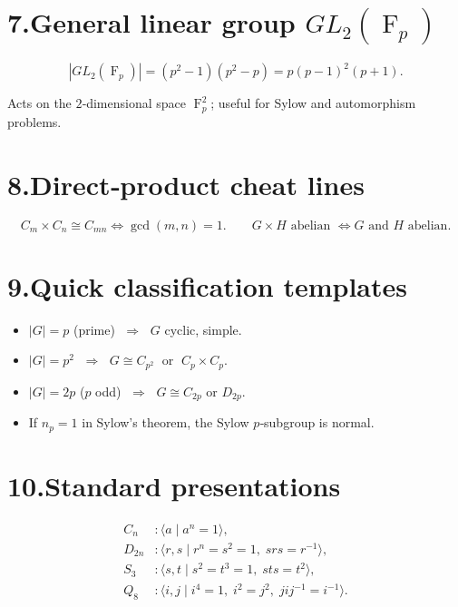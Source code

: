 \documentclass[12pt]{article}
\DeclareMathOperator{\F}{F}
\theoremstyle{definition} %
\theoremstyle{plain} %
\begin{document}
  \bigskip
  \section*{7.\;General linear group $GL_{2}(\F_{p})$}
  
  \[
     |GL_{2}(\F_{p})|=(p^{2}-1)(p^{2}-p)=p(p-1)^{2}(p+1).
  \]
  
  Acts on the $2$‑dimensional space $\F_{p}^{2}$; useful for Sylow and automorphism problems.
  
  \bigskip
  \section*{8.\;Direct‑product cheat lines}
  
  \[
     C_{m}\times C_{n}\cong C_{mn}\iff\gcd(m,n)=1.
  \qquad
     G\times H \text{ abelian } \iff G \text{ and } H \text{ abelian}.
  \]
  
  \bigskip
  \section*{9.\;Quick classification templates}
  
  \begin{itemize}
    \item $|G|=p$ (prime) $\;\Longrightarrow\;$ $G$ cyclic, simple.
    \item $|G|=p^{2}$ $\;\Longrightarrow\;$ $G\cong C_{p^{2}}\;$ or $\;C_{p}\times C_{p}$.
    \item $|G|=2p$ ($p$ odd) $\;\Longrightarrow\;$ $G\cong C_{2p}$ or $D_{2p}$.
    \item If $n_{p}=1$ in Sylow’s theorem, the Sylow $p$‑subgroup is normal.
  \end{itemize}
  
  \bigskip
  \section*{10.\;Standard presentations}
  
  \[
  \begin{aligned}
  C_{n}\! &: \langle a\mid a^{n}=1\rangle,\\
  D_{2n}\! &: \langle r,s\mid r^{n}=s^{2}=1,\;srs=r^{-1}\rangle,\\
  S_{3}\!  &: \langle s,t\mid s^{2}=t^{3}=1,\;sts=t^{2}\rangle,\\
  Q_{8}\!  &: \langle i,j\mid i^{4}=1,\;i^{2}=j^{2},\; jij^{-1}=i^{-1}\rangle.
  \end{aligned}
  \]
  
\end{document}
